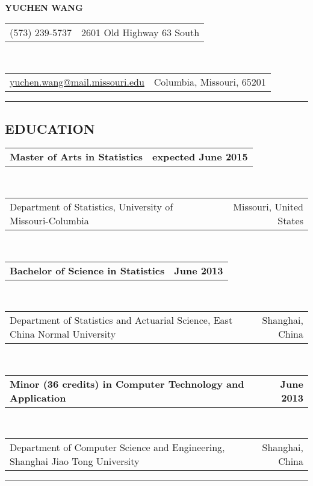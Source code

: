 \documentclass[11pt]{article}
\makeatletter
\newcommand{\headerrow}[2]
{\begin{tabular*}{\linewidth}{l@{\extracolsep{\fill}}r}
	#1 &
	#2 \\
\end{tabular*}}
\makeatother
\begin{document}
\begin{center}
\huge \textbf{YUCHEN WANG\\}
\end{center}

\noindent\headerrow
{(573) 239-5737}
{2601 Old Highway 63 South}
\\
\headerrow
{\href{mailto://yuchen.wang@mail.missouri.edu}{yuchen.wang@mail.missouri.edu}}
{Columbia, Missouri, 65201}

\vspace{0.2em}
\hrule
\vspace{-1em}


\subsection*{\centering EDUCATION}

\headerrow
	{\textbf{Master of Arts in Statistics}}
	{\textbf{expected June 2015}}
\\
\headerrow
	{Department of Statistics, University of Missouri-Columbia}
	{Missouri, United States}
\\
\headerrow
	{\textbf{Bachelor of Science in Statistics}}
	{\textbf{June 2013}}
\\
\headerrow
	{Department of Statistics and Actuarial Science, East China Normal University}
	{Shanghai, China}
\\
\headerrow
	{\textbf{Minor (36 credits) in Computer Technology and Application}}
	{\textbf{June 2013}}
\\
\headerrow
	{Department of Computer Science and Engineering, Shanghai Jiao Tong University}
	{Shanghai, China}


\vspace{0.2em}
\hrule
\vspace{-1em}
\end{document}
